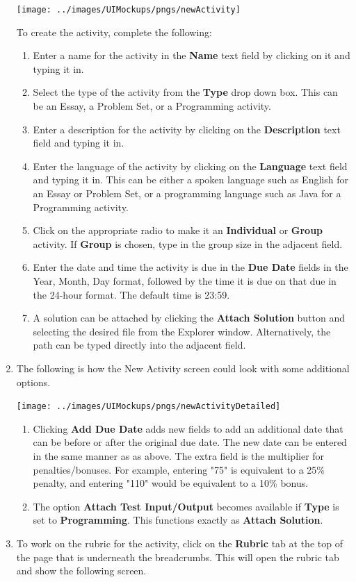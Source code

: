 \documentclass{article}
\begin{document}
\begin{enumerate}
\begin{center}
   \texttt{[image: ../images/UIMockups/pngs/newActivity]}
   \label{newActivity}
  \end{center}
  To create the activity, complete the following:
  \begin{enumerate}
  \item Enter a name for the activity in the \textbf{Name} text field by clicking on 
  it and typing it in.
  \item Select the type of the activity from the \textbf{Type} drop down box.
  This can be an Essay, a Problem Set, or a Programming activity.
  \item Enter a description for the activity by clicking on the \textbf{Description} 
  text field and typing it in.
  \item Enter the language of the activity by clicking on the \textbf{Language} text
  field and typing it in. This can be either a spoken language such as English 
  for an Essay or Problem Set, or a programming language such as Java for a Programming
  activity.
  \item Click on the appropriate radio to make it an \textbf{Individual} or 
  \textbf{Group} activity. If \textbf{Group} is chosen, type in the group size in the 
  adjacent field.
  \item Enter the date and time the activity is due in the \textbf{Due Date} fields 
  in the Year, Month, Day format, followed by the time it is due on that due in
  the 24-hour format. The default time is 23:59.
  \item A solution can be attached by clicking the \textbf{Attach Solution} button and 
  selecting the desired file from the Explorer window. Alternatively, the path can be 
  typed directly into the adjacent field.
  \end{enumerate}
  \item The following is how the New Activity screen could look with some
    additional options. 
  \begin{center} 
   \texttt{[image: ../images/UIMockups/pngs/newActivityDetailed]}
 
  \end{center}
  \begin{enumerate}
  \item Clicking \textbf{Add Due Date} adds new fields to add an additional
    date that can be before or after the original due date. The new date can
    be entered in the same manner as as above. The extra field is the multiplier
    for penalties/bonuses. For example, entering "75" is equivalent to a 25\%
    penalty, and entering "110" would be equivalent to a 10\% bonus.
  \item The option \textbf{Attach Test Input/Output} becomes available if \textbf{Type} 
  is set to \textbf{Programming}. This functions exactly as \textbf{Attach Solution}.
 \end{enumerate}
 \item To work on the rubric for the activity, click on the \textbf{Rubric} tab at the 
 top of the page that is underneath the breadcrumbs. This will open the rubric tab and 
 show the following screen.
 \begin{center} 
 


\end{center}
\end{enumerate}
\end{document}
